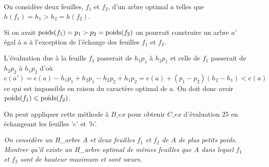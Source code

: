 \begin{Answer}
On considère deux feuilles, $f_1$ et $f_2$, d'un arbre optimal $a$ telles que $h(f_1) = h_1 > h_2 = h(f_2)$.

Si on avait $\hbox{poids}(f_1) = p_1 > p_2 = \hbox{poids}(f_2)$ on pourrait construire un arbre $a'$ égal à $a$ à l'exception de l'échange des feuilles $f_1$ et $f_2$. 

L'évaluation due à la feuille $f_1$ passerait de $h_1p_1$ à $h_2p_1$ et celle de $f_1$ passerait de $h_2p_2$ à $h_1p_2$ d'où $e(a') =e(a) -h_1p_1 + h_2p_1 - h_2p_2 + h_1p_2=e(a)+(p_1-p_2)(h_2-h_1) < e(a)$ ce qui est impossible en raison du caractère optimal de $a$.
On doit donc avoir $\hbox{poids}(f_1) \le  \hbox{poids}(f_2)$.

\medskip

On peut appliquer cette méthode à $B\_{ex}$ pour obtenir $C\_{ex}$ d'évaluation 25 en échangeant les feuilles 'c' et 'b'.
\begin{center}
\end{center}

\end{Answer}
\begin{Exercise}[label=ques:2soeurs]\it
On considère un H\_arbre $A$ et deux feuilles $f_1$ et $f_2$ de $A$ de plus petits poids. Montrer qu’il existe
un H\_arbre optimal de mêmes feuilles que $A$ dans lequel $f_1$ et $f_2$ sont de hauteur maximum et sont sœurs.
\end{Exercise}
